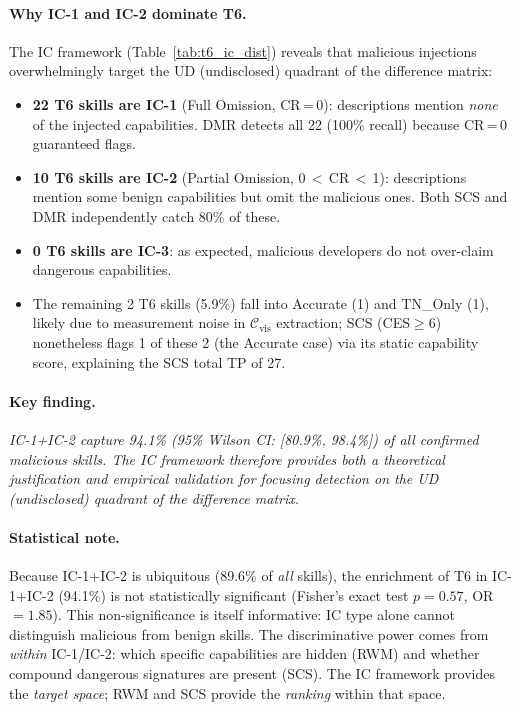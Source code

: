 \paragraph{Why IC-1 and IC-2 dominate T6.}
The IC framework (Table~\ref{tab:t6_ic_dist}) reveals that
malicious injections overwhelmingly target the UD (undisclosed)
quadrant of the difference matrix:
\begin{itemize}
    \item \textbf{22 T6 skills are IC-1} (Full Omission, CR\,=\,0):
    descriptions mention \emph{none} of the injected capabilities.
    DMR detects all 22 (100\% recall) because CR\,=\,0 guaranteed flags.
    \item \textbf{10 T6 skills are IC-2} (Partial Omission, 0\,$<$\,CR\,$<$\,1):
    descriptions mention some benign capabilities but omit the malicious ones.
    Both SCS and DMR independently catch 80\% of these.
    \item \textbf{0 T6 skills are IC-3}: as expected,
    malicious developers do not over-claim dangerous capabilities.
    \item The remaining 2 T6 skills (5.9\%) fall into Accurate (1) and TN\_Only (1),
    likely due to measurement noise in $\mathcal{C}_{\text{vis}}$ extraction;
    SCS (CES$\geq$6) nonetheless flags 1 of these 2 (the Accurate case)
    via its static capability score, explaining the SCS total TP of 27.
\end{itemize}

\paragraph{Key finding.}
\textit{IC-1+IC-2 capture 94.1\% (95\% Wilson CI: [80.9\%, 98.4\%])
of all confirmed malicious skills.
The IC framework therefore provides both a theoretical justification
and empirical validation for focusing detection on the UD (undisclosed)
quadrant of the difference matrix.}

\paragraph{Statistical note.}
Because IC-1+IC-2 is ubiquitous (89.6\% of \emph{all} skills),
the enrichment of T6 in IC-1+IC-2 (94.1\%) is not statistically
significant (Fisher's exact test $p = 0.57$, OR $= 1.85$).
This non-significance is itself informative:
IC type alone cannot distinguish malicious from benign skills.
The discriminative power comes from \emph{within} IC-1/IC-2:
which specific capabilities are hidden (RWM) and whether
compound dangerous signatures are present (SCS).
The IC framework provides the \emph{target space};
RWM and SCS provide the \emph{ranking} within that space.

